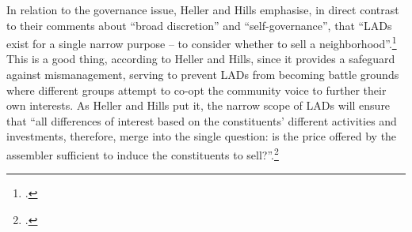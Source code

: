 In relation to the governance issue, Heller and Hills emphasise, in direct contrast to their comments about ``broad discretion'' and ``self-governance'', that ``LADs exist for a single narrow purpose -- to consider whether to sell a neighborhood''.\footcite[See][1500]{heller08} This is a good thing, according to Heller and Hills, since it provides a safeguard against mismanagement, serving to prevent LADs from becoming battle grounds where different groups attempt to co-opt the community voice to further their own interests. As Heller and Hills put it, the narrow scope of LADs will ensure that ``all differences of interest based on the constituents' different activities and investments, therefore, merge into the single question: is the price offered by the assembler sufficient to induce the constituents to sell?''.\footcite[1500]{heller08}

